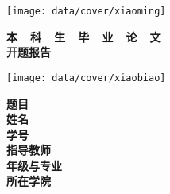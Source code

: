 \thispagestyle{empty}

{
\setlength{\parindent}{0em}
\renewcommand{\baselinestretch}{2}

\vspace*{-7mm}

\begin{center}
  \texttt{[image: data/cover/xiaoming]}
\end{center}

\vspace{-1mm}

{
\renewcommand{\baselinestretch}{1.8}
\heiti\erhao\bfseries
\centering
本~~科~~生~~毕~~业~~论~~文 \\
开题报告 \par
}

\vspace{4em}

\begin{center}
  \texttt{[image: data/cover/xiaobiao]}
\end{center}

\vspace{3em}

{
\renewcommand{\baselinestretch}{1.65}
\songti\sanhao\bfseries
\centering
题目 \; \underline{\makebox[16em]{\zjutitlec}} \\
姓名 \; \underline{\makebox[16em]{\zjuauthornamec}} \\
学号 \; \underline{\makebox[16em]{\zjuauthorid}} \\
指导教师 \; \underline{\makebox[14em]{\zjumentorc}} \\
年级与专业 \; \underline{\makebox[13em]{\zjugrade~~\zjumajor}} \\
所在学院 \; \underline{\makebox[14em]{\zjucollegec}} \par
}
}


